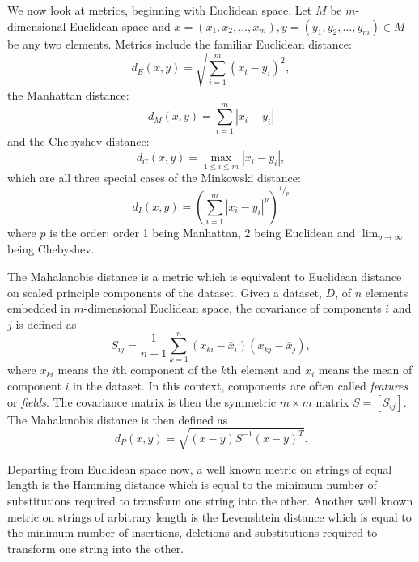 \documentclass[a4paper]{report}
\newcommand{\dset}{D}
\newcommand{\prettyfrac}[2]{^#1\!/\!_#2}
\begin{document}
We now look at metrics, beginning with Euclidean space.  Let $M$ be
$m$-dimensional Euclidean space and $x=(x_1,x_2,\dotsc,x_m),
y=(y_1,y_2,\dotsc,y_m) \in M$ be any two elements.  Metrics include the
familiar Euclidean distance:
\begin{equation*}
  d_E(x,y) = \sqrt{\sum_{i=1}^{m} (x_i - y_i)^2},
\end{equation*}
the Manhattan distance:
\begin{equation*}
  d_{M}(x,y) = \sum_{i=1}^{m} |x_i - y_i|
\end{equation*}
and the Chebyshev distance:
\begin{equation*}
  d_C(x,y) = \max_{1 \leq i \leq m} |x_i - y_i|,
\end{equation*}
which are all three special cases of the Minkowski distance:
\begin{equation*}
  d_{I}(x,y) = \left(\sum_{i=1}^{m} |x_i - y_i|^{p}\right)^{\prettyfrac{1}{p}}
\end{equation*}
where $p$ is the order; order 1 being Manhattan, 2 being Euclidean and
$\lim_{p \to \infty}$ being Chebyshev.

The Mahalanobis distance \citep{mahalanobis30distance} is a metric which is
equivalent to Euclidean distance on scaled principle components of the
dataset.  Given a dataset, $\dset$, of $n$ elements embedded in
$m$-dimensional Euclidean space, the covariance of components $i$ and $j$ is
defined as
\begin{equation*}
  S_{ij} = \frac{1}{n-1} \sum_{k=1}^{n} (x_{ki}-\bar{x}_i)(x_{kj}-\bar{x}_j),
\end{equation*}
where $x_{ki}$ means the $i$th component of the $k$th element and $\bar{x}_i$
means the mean of component $i$ in the dataset.  In this context, components
are often called \textit{features} or \textit{fields}.  The covariance matrix
is then the symmetric $m \times m$ matrix $S = [S_{ij}]$.  The Mahalanobis
distance is then defined as
\begin{equation*}
  d_{P}(x,y) = \sqrt{(x-y)S^{-1}(x-y)^T}.
\end{equation*}

Departing from Euclidean space now, a well known metric on strings of equal
length is the Hamming distance \citep{hamming50errorcodes} which is equal to
the minimum number of substitutions required to transform one string into the
other.  Another well known metric on strings of arbitrary length is the
Levenshtein distance \citep{levenshtein1965distance} which is equal to the
minimum number of insertions, deletions and substitutions required to
transform one string into the other.
\end{document}
